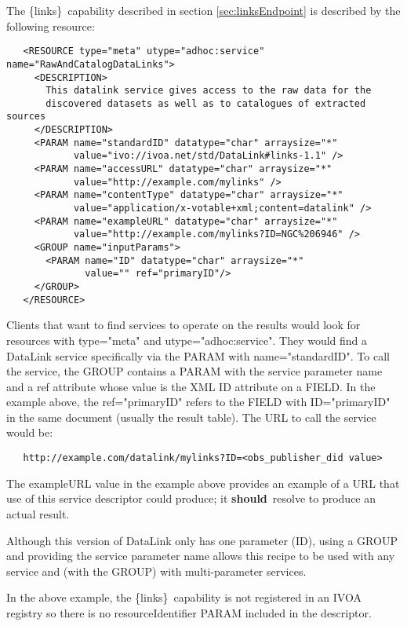 \documentclass[11pt,a4paper]{ivoa}
\newcommand{\blinks}{\{links\}}
\newcommand{\attval}[2]{#1={\allowbreak}{"}#2{"}}
\newcommand{\rfcshould}{\textbf{should}}
\begin{document}
The \blinks\ capability described in section \ref{sec:linksEndpoint}
is described by the following resource:
\begin{verbatim}
   <RESOURCE type="meta" utype="adhoc:service" name="RawAndCatalogDataLinks">
     <DESCRIPTION>
       This datalink service gives access to the raw data for the
       discovered datasets as well as to catalogues of extracted sources
     </DESCRIPTION>
     <PARAM name="standardID" datatype="char" arraysize="*"
            value="ivo://ivoa.net/std/DataLink#links-1.1" />
     <PARAM name="accessURL" datatype="char" arraysize="*"
            value="http://example.com/mylinks" />
     <PARAM name="contentType" datatype="char" arraysize="*"
            value="application/x-votable+xml;content=datalink" />
     <PARAM name="exampleURL" datatype="char" arraysize="*"
            value="http://example.com/mylinks?ID=NGC%206946" />
     <GROUP name="inputParams">
       <PARAM name="ID" datatype="char" arraysize="*"
              value="" ref="primaryID"/>
     </GROUP>
   </RESOURCE>
\end{verbatim}

Clients that want to find services to operate on the results would look
for resources with \attval{type}{meta} and \attval{utype}{adhoc:service}.
They would find a DataLink service specifically via the PARAM with
\attval{name}{standardID}. To call the service, the GROUP contains a PARAM
with the service parameter name and a ref attribute whose value is the
XML ID attribute on a FIELD. In the example above, the \attval{ref}{primaryID}
refers to the FIELD with \attval{ID}{primaryID} in the same document (usually
the result table). The URL to call the service would be:
\begin{verbatim}
   http://example.com/datalink/mylinks?ID=<obs_publisher_did value>
\end{verbatim}

The exampleURL value in the example above provides an example
of a URL that use of this service descriptor could produce;
it \rfcshould\ resolve to produce an actual result.

Although this version of DataLink only has one parameter (ID), using a
GROUP and providing the service parameter name allows this recipe to be
used with any service and (with the GROUP) with multi-parameter services.

In the above example, the \blinks\ capability is not registered in an
IVOA registry so there is no resourceIdentifier PARAM included in the
descriptor.
\end{document}
